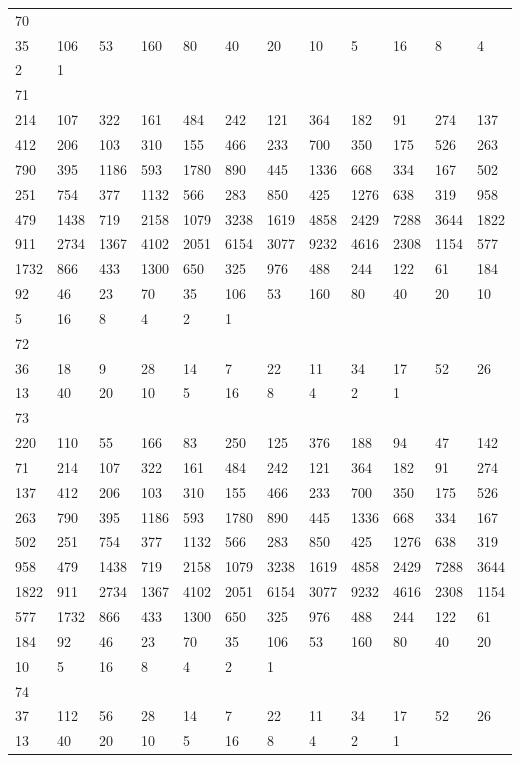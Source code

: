 \begin{longtable}{llllllllllll}
70&&&&&&&&&&&\\
35& 106& 53& 160& 80& 40& 20& 10& 5& 16& 8& 4\\
2& 1& \\

71&&&&&&&&&&&\\
214& 107& 322& 161& 484& 242& 121& 364& 182& 91& 274& 137\\
412& 206& 103& 310& 155& 466& 233& 700& 350& 175& 526& 263\\
790& 395& 1186& 593& 1780& 890& 445& 1336& 668& 334& 167& 502\\
251& 754& 377& 1132& 566& 283& 850& 425& 1276& 638& 319& 958\\
479& 1438& 719& 2158& 1079& 3238& 1619& 4858& 2429& 7288& 3644& 1822\\
911& 2734& 1367& 4102& 2051& 6154& 3077& 9232& 4616& 2308& 1154& 577\\
1732& 866& 433& 1300& 650& 325& 976& 488& 244& 122& 61& 184\\
92& 46& 23& 70& 35& 106& 53& 160& 80& 40& 20& 10\\
5& 16& 8& 4& 2& 1& \\

72&&&&&&&&&&&\\
36& 18& 9& 28& 14& 7& 22& 11& 34& 17& 52& 26\\
13& 40& 20& 10& 5& 16& 8& 4& 2& 1& \\

73&&&&&&&&&&&\\
220& 110& 55& 166& 83& 250& 125& 376& 188& 94& 47& 142\\
71& 214& 107& 322& 161& 484& 242& 121& 364& 182& 91& 274\\
137& 412& 206& 103& 310& 155& 466& 233& 700& 350& 175& 526\\
263& 790& 395& 1186& 593& 1780& 890& 445& 1336& 668& 334& 167\\
502& 251& 754& 377& 1132& 566& 283& 850& 425& 1276& 638& 319\\
958& 479& 1438& 719& 2158& 1079& 3238& 1619& 4858& 2429& 7288& 3644\\
1822& 911& 2734& 1367& 4102& 2051& 6154& 3077& 9232& 4616& 2308& 1154\\
577& 1732& 866& 433& 1300& 650& 325& 976& 488& 244& 122& 61\\
184& 92& 46& 23& 70& 35& 106& 53& 160& 80& 40& 20\\
10& 5& 16& 8& 4& 2& 1& \\

74&&&&&&&&&&&\\
37& 112& 56& 28& 14& 7& 22& 11& 34& 17& 52& 26\\
13& 40& 20& 10& 5& 16& 8& 4& 2& 1& \\


\end{longtable}
